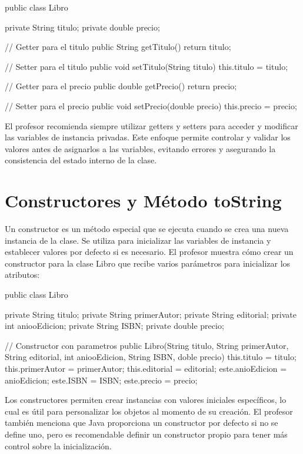 \documentclass[a4paper]{report}
\begin{document}
\begin{roundedlst}
public class Libro {
    private String titulo;
    private double precio;

    // Getter para el titulo
    public String getTitulo() {
        return titulo;
    }

    // Setter para el titulo
    public void setTitulo(String titulo) {
        this.titulo = titulo;
    }

    // Getter para el precio
    public double getPrecio() {
        return precio;
    }

    // Setter para el precio
    public void setPrecio(double precio) {
        this.precio = precio;
    }
}
\end{roundedlst}

El profesor recomienda siempre utilizar getters y setters para acceder y modificar las variables de instancia privadas. Este enfoque permite controlar y validar los valores antes de asignarlos a las variables, evitando errores y asegurando la consistencia del estado interno de la clase.

\section{Constructores y Método toString}
Un constructor es un método especial que se ejecuta cuando se crea una nueva instancia de la clase. Se utiliza para inicializar las variables de instancia y establecer valores por defecto si es necesario. El profesor muestra cómo crear un constructor para la clase Libro que recibe varios parámetros para inicializar los atributos:

\begin{roundedlst}
public class Libro {
    private String titulo;
    private String primerAutor;
    private String editorial;
    private int aniooEdicion;
    private String ISBN;
    private double precio;

    // Constructor con parametros
    public Libro(String titulo, String primerAutor, 
                 String editorial, int aniooEdicion, 
                 String ISBN, doble precio) {
        this.titulo = titulo;
        this.primerAutor = primerAutor;
        this.editorial = editorial;
        este.anioEdicion = anioEdicion;
        este.ISBN = ISBN;
        este.precio = precio;
    }
}
\end{roundedlst}

Los constructores permiten crear instancias con valores iniciales específicos, lo cual es útil para personalizar los objetos al momento de su creación. El profesor también menciona que Java proporciona un constructor por defecto si no se define uno, pero es recomendable definir un constructor propio para tener más control sobre la inicialización.
\end{document}
